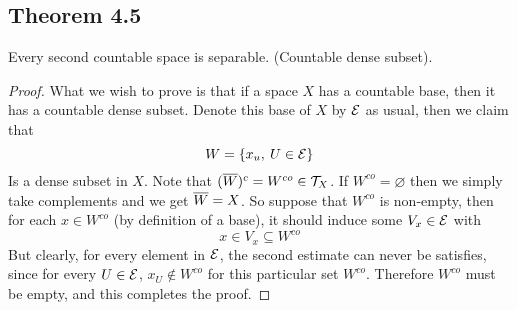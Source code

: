 \documentclass[../../main.tex]{subfiles}
\begin{document}
\subsection{Theorem 4.5}
\begin{wts}
    Every second countable space is separable. (Countable dense subset).
\end{wts}
\begin{proof}
What we wish to prove is that if a space $X$ has a countable base, then it has a countable dense subset. Denote this base of $X$ by $\mathcal{E}$ as usual, then we claim that 
\[
W = \{x_u,\:U\in\mathcal{E}\}
\]
Is a dense subset in $X$. Note that $(\overline{W})^c= W^{co}\in\mathcal{T}_X$. If $W^{co}=\varnothing$ then we simply take complements and we get $\overline{W}=X$. So suppose that $W^{co}$ is non-empty, then for each $x\in W^{co}$ (by definition of a base), it should induce some $V_x\in\mathcal{E}$ with
\[
x\in V_x\subseteq W^{co}
\]
But clearly, for every element in $\mathcal{E}$, the second estimate can never be satisfies, since for every $U\in\mathcal{E}$, $x_U\notin W^{co}$ for this particular set $W^{co}$. Therefore $W^{co}$ must be empty, and this completes the proof.
\end{proof}
\end{document}
